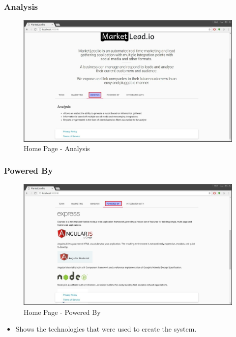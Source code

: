 \documentclass{article}
\begin{document}
			\subsubsection{Analysis}
				\begin{figure}[H]
					\includegraphics[width=\textwidth]{images/home_analysis.jpg}
					\caption{Home Page - Analysis}
				\end{figure}

			\subsubsection{Powered By}
				\begin{figure}[H]
					\includegraphics[width=\textwidth]{images/home_powered_by.jpg}
					\caption{Home Page - Powered By}
				\end{figure}

				\begin{itemize}
					\item Shows the technologies that were used to create the system.
				\end{itemize}
\end{document}
